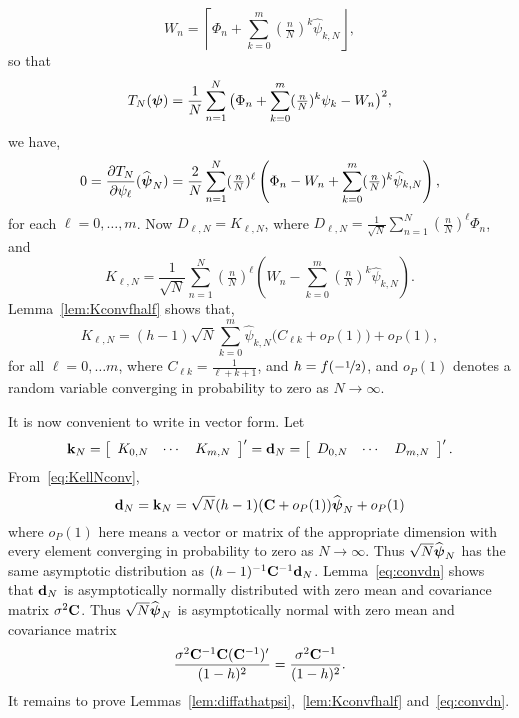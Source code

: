 \documentclass[aap]{imsart}
\newcommand{\round}[1]{{\left\lceil #1 \right\rfloor}}
\begin{document}
\begin{equation}\label{eq:Wn}
W_{n} = \round{\Phi_n + \sum_{k=0}^m (\tfrac{n}{N})^k \widehat{\psi}_{k,N}},
\end{equation}
so that 
\[
T_{N}(\boldsymbol{\psi}) = \frac{1}{N} \sum_{n=1}^{N} \big( \Phi_n + \sum_{k=0}^m (\tfrac{n}{N})^k \psi_k  - W_n \big)^2,
\] 
we have,
\begin{align*}
0  = \frac{\partial T_N}{\partial \psi_\ell}(\widehat{\psibf}_N) = \frac{2}{N}\sum_{n=1}^{N}(\tfrac{n}{N})^\ell\left( \Phi_n - W_{n}+ \sum_{k=0}^{m}(\tfrac{n}{N})^k \widehat{\psi}_{k,N}  \right),
\end{align*}
for each $\ell = 0, \dots, m$.  Now $D_{\ell,N} = K_{\ell,N}$, where $D_{\ell,N} = \frac{1}{\sqrt{N}} \sum_{n=1}^{N}(\tfrac{n}{N})^\ell \Phi_n$, and
\begin{equation}\label{eq:KellN}
K_{\ell,N} = \frac{1}{\sqrt{N}}\sum_{n=1}^{N}(\tfrac{n}{N})^\ell\left(W_{n}- \sum_{k=0}^{m}(\tfrac{n}{N})^k \widehat{\psi}_{k,N}  \right).
\end{equation}
Lemma~\ref{lem:Kconvfhalf} shows that,
\begin{equation}\label{eq:KellNconv}
K_{\ell,N} =  (h - 1) \sqrt{N} \sum_{k=0}^{m}  \widehat{\psi}_{k,N} \big( C_{\ell k} + o_P(1) \big) + o_P(1),
\end{equation}
for all $\ell = 0, \dots m$, where $C_{\ell k} =  \tfrac{1}{\ell + k + 1}$, and $h = f(-\nicefrac{1}{2})$, and $o_P(1)$ denotes a random variable converging in probability to zero as $N\rightarrow\infty$.

It is now convenient to write in vector form.  Let 
\begin{equation}\label{eq:dnandkn}
\kbf_N = 
\left[
\begin{array}{ccc}%
K_{0,N}  & \cdots & K_{m,N}
\end{array}
\right]^\prime
=
\dbf_N = \left[
\begin{array}{ccc}%
D_{0,N}  & \cdots & D_{m,N}
\end{array}
\right]^\prime.
\end{equation}
From~\eqref{eq:KellNconv},
\[
\mathbf{d}_N = \mathbf{k}_N = \sqrt{N} (h - 1)(\mathbf{C} + o_P(1)) \widehat{\boldsymbol{\psi}}_N + o_P(1)
\]
where $o_P(1)$ here means a vector or matrix of the appropriate dimension with every element converging in probability to zero as $N\rightarrow\infty$.  Thus $\sqrt{N}\widehat{\boldsymbol{\psi}}_N$ has the same asymptotic distribution as $(h - 1)^{-1}\mathbf{C}^{-1} \mathbf{d}_N$.  Lemma~\ref{eq:convdn} shows that $\mathbf{d}_N$ is asymptotically normally distributed with zero mean and covariance matrix $\sigma^2\mathbf{C}$.  Thus $\sqrt{N}\widehat{\boldsymbol{\psi}}_N$ is asymptotically normal with zero mean and covariance matrix
\[
\frac{\sigma^2\mathbf{C}^{-1}\mathbf{C}(\mathbf{C}^{-1})^\prime}{(1 - h)^2} = 
\frac{\sigma^2\mathbf{C}^{-1}}{(1 - h)^2}.
\] 
It remains to prove Lemmas~\ref{lem:diffathatpsi},~\ref{lem:Kconvfhalf} and~\ref{eq:convdn}.
\end{document}
